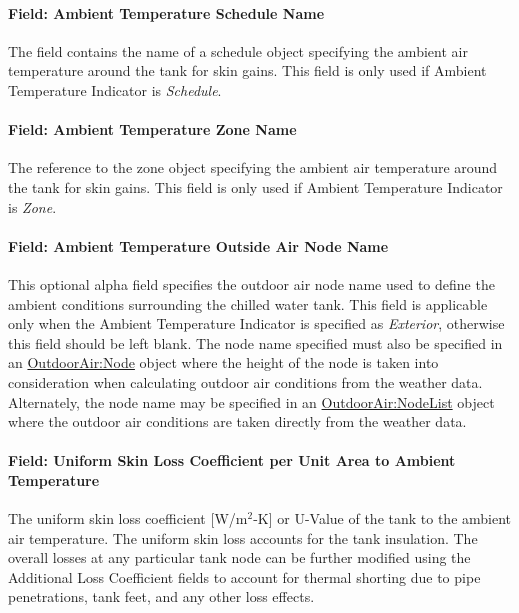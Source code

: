 \paragraph{Field: Ambient Temperature Schedule Name}\label{field-ambient-temperature-schedule-name-1}

The field contains the name of a schedule object specifying the ambient air temperature around the tank for skin gains. This field is only used if Ambient Temperature Indicator is \emph{Schedule}.

\paragraph{Field: Ambient Temperature Zone Name}\label{field-ambient-temperature-zone-name-1}

The reference to the zone object specifying the ambient air temperature around the tank for skin gains. This field is only used if Ambient Temperature Indicator is \emph{Zone}.

\paragraph{Field: Ambient Temperature Outside Air Node Name}\label{field-ambient-temperature-outside-air-node-name-000}

This optional alpha field specifies the outdoor air node name used to define the ambient conditions surrounding the chilled water tank. This field is applicable only when the Ambient Temperature Indicator is specified as \emph{Exterior}, otherwise this field should be left blank. The node name specified must also be specified in an \hyperref[outdoorairnode]{OutdoorAir:Node} object where the height of the node is taken into consideration when calculating outdoor air conditions from the weather data. Alternately, the node name may be specified in an \hyperref[outdoorairnodelist]{OutdoorAir:NodeList} object where the outdoor air conditions are taken directly from the weather data.

\paragraph{Field: Uniform Skin Loss Coefficient per Unit Area to Ambient Temperature}\label{field-uniform-skin-loss-coefficient-per-unit-area-to-ambient-temperature}

The uniform skin loss coefficient {[}W/m\(^{2}\)-K{]} or U-Value of the tank to the ambient air temperature. The uniform skin loss accounts for the tank insulation. The overall losses at any particular tank node can be further modified using the Additional Loss Coefficient fields to account for thermal shorting due to pipe penetrations, tank feet, and any other loss effects.

